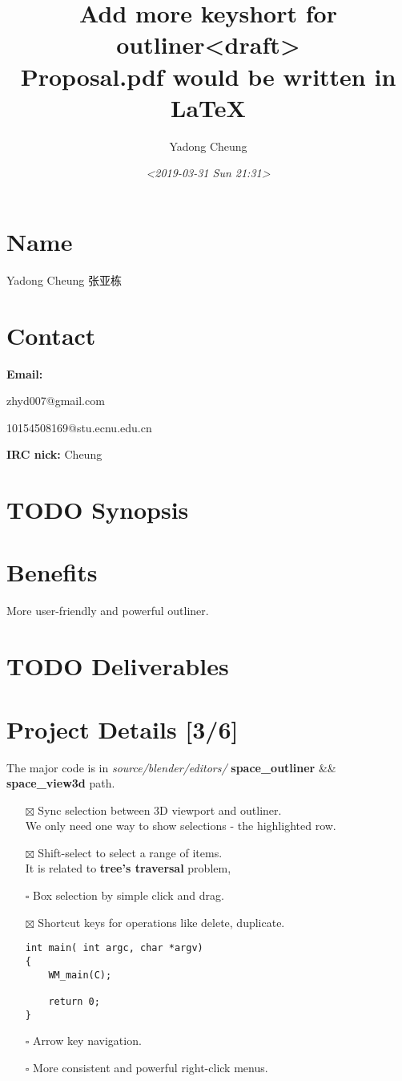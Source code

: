 \documentclass[11pt]{article}
\author{Yadong Cheung}
\date{\textit{<2019-03-31 Sun 21:31>}}
\title{Add more keyshort for outliner<draft>\\\medskip
\large Proposal.pdf would be written in \LaTeX}
\begin{document}
\maketitle


\section*{Name}
\label{sec:org039d390}
Yadong Cheung 张亚栋

\section*{Contact}
\label{sec:org0be7834}
\textbf{Email:}

zhyd007@gmail.com

10154508169@stu.ecnu.edu.cn

\textbf{IRC nick:} Cheung

\section*{{\bfseries\sffamily TODO} Synopsis}
\label{sec:orgf214ac8}

\section*{Benefits}
\label{sec:org2a8946b}
More user-friendly and powerful outliner.

\section*{{\bfseries\sffamily TODO} Deliverables}
\label{sec:org54d0a62}

\section*{Project Details [3/6]}
\label{sec:orge853eeb}
 The major code is in \emph{source/blender/editors/} \textbf{space\_outliner} \&\& \textbf{space\_view3d}
path.
\begin{itemize}
\item[{$\boxtimes$}] Sync selection between 3D viewport and outliner.\\
We only need one way to show selections - the highlighted row.
\item[{$\boxtimes$}] Shift-select to select a range of items.\\
It is related to \textbf{tree's traversal} problem,
\item[{$\square$}] Box selection by simple click and drag.
\item[{$\boxtimes$}] Shortcut keys for operations like delete, duplicate.\\
\begin{verbatim}
int main( int argc, char *argv)
{
    WM_main(C);

    return 0;
}
\end{verbatim}
\item[{$\square$}] Arrow key navigation.
\item[{$\square$}] More consistent and powerful right-click menus.
\end{itemize}
\end{document}
